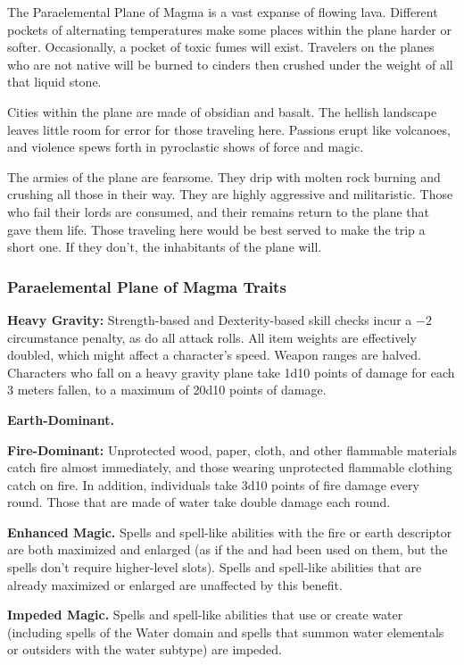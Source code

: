 The Paraelemental Plane of Magma is a vast expanse of flowing lava. Different pockets of alternating temperatures make some places within the plane harder or softer. Occasionally, a pocket of toxic fumes will exist. Travelers on the planes who are not native will be burned to cinders then crushed under the weight of all that liquid stone.

Cities within the plane are made of obsidian and basalt. The hellish landscape leaves little room for error for those traveling here. Passions erupt like volcanoes, and violence spews forth in pyroclastic shows of force and magic.
 
The armies of the plane are fearsome. They drip with molten rock burning and crushing all those in their way. They are highly aggressive and militaristic. Those who fail their lords are consumed, and their remains return to the plane that gave them life. Those traveling here would be best served to make the trip a short one. If they don't, the inhabitants of the plane will.

\subsubsection{Paraelemental Plane of Magma Traits}
\begin{itemize*}
\item \textbf{Heavy Gravity:} Strength-based and Dexterity-based skill checks incur a $-2$ circumstance penalty, as do all attack rolls. All item weights are effectively doubled, which might affect a character's speed. Weapon ranges are halved. Characters who fall on a heavy gravity plane take 1d10 points of damage for each 3 meters fallen, to a maximum of 20d10 points of damage.
\item \textbf{Earth-Dominant.}
\item \textbf{Fire-Dominant:} Unprotected wood, paper, cloth, and other flammable materials catch fire almost immediately, and those wearing unprotected flammable clothing catch on fire. In addition, individuals take 3d10 points of fire damage every round. Those that are made of water take double damage each round.
\item \textbf{Enhanced Magic.} Spells and spell-like abilities with the fire or earth descriptor are both maximized and enlarged (as if the  and  had been used on them, but the spells don't require higher-level slots). Spells and spell-like abilities that are already maximized or enlarged are unaffected by this benefit.
\item \textbf{Impeded Magic.} Spells and spell-like abilities that use or create water (including spells of the Water domain and spells that summon water elementals or outsiders with the water subtype) are impeded.
\end{itemize*}
